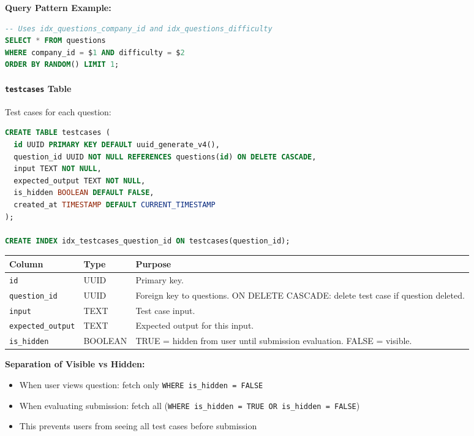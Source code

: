 \documentclass[12pt,a4paper,oneside]{article}
\newcommand{\varname}[1]{\texttt{#1}}
\newcommand{\database}[1]{\texttt{#1}}
\begin{document}
\textbf{Query Pattern Example:}

\begin{lstlisting}[language=SQL, caption=Indexed Query Example]
-- Uses idx_questions_company_id and idx_questions_difficulty
SELECT * FROM questions 
WHERE company_id = $1 AND difficulty = $2 
ORDER BY RANDOM() LIMIT 1;
\end{lstlisting}

\paragraph{\database{testcases} Table}

Test cases for each question:

\begin{lstlisting}[language=SQL, caption=Test Cases Table Schema]
CREATE TABLE testcases (
  id UUID PRIMARY KEY DEFAULT uuid_generate_v4(),
  question_id UUID NOT NULL REFERENCES questions(id) ON DELETE CASCADE,
  input TEXT NOT NULL,
  expected_output TEXT NOT NULL,
  is_hidden BOOLEAN DEFAULT FALSE,
  created_at TIMESTAMP DEFAULT CURRENT_TIMESTAMP
);

CREATE INDEX idx_testcases_question_id ON testcases(question_id);
\end{lstlisting}

\begin{table}[H]
\centering
\begin{tabular}{|p{2.5cm}|p{1.8cm}|p{9.7cm}|}
\hline
\textbf{Column} & \textbf{Type} & \textbf{Purpose} \\
\hline
\varname{id} & UUID & Primary key. \\
\hline
\varname{question\_id} & UUID & Foreign key to questions. ON DELETE CASCADE: delete test case if question deleted. \\
\hline
\varname{input} & TEXT & Test case input. \\
\hline
\varname{expected\_output} & TEXT & Expected output for this input. \\
\hline
\varname{is\_hidden} & BOOLEAN & TRUE = hidden from user until submission evaluation. FALSE = visible. \\
\hline
\end{tabular}
\end{table}

\textbf{Separation of Visible vs Hidden:}

\begin{itemize}
    \item When user views question: fetch only \texttt{WHERE is\_hidden = FALSE}
    \item When evaluating submission: fetch all (\texttt{WHERE is\_hidden = TRUE OR is\_hidden = FALSE})
    \item This prevents users from seeing all test cases before submission
\end{itemize}
\end{document}

